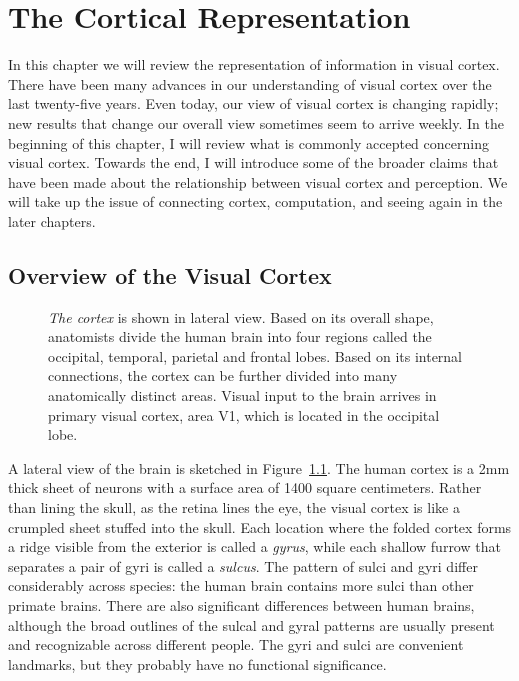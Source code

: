 \chapter{The Cortical Representation}
\label{chapter:Cortex}

In this chapter we will review the representation of information in
visual cortex.  There have been many advances in our understanding of
visual cortex over the last twenty-five years.  Even today, our view
of visual cortex is changing rapidly; new results that change our
overall view sometimes seem to arrive weekly.  In the beginning of
this chapter, I will review what is commonly accepted concerning
visual cortex.  Towards the end, I will introduce some of the broader
claims that have been made about the relationship between visual
cortex and perception.  We will take up the issue of connecting
cortex, computation, and seeing again in the later chapters.

\section{Overview of the Visual Cortex}

\begin{figure}
\centerline{
}
\caption[A view of the brain]{
{\em The cortex} is shown in lateral view.
Based on its overall shape,
anatomists divide the human brain into four regions
called the occipital, temporal, parietal and frontal lobes.
Based on its internal connections,
the cortex can be further divided into many 
anatomically distinct areas.
Visual input to the brain arrives in primary visual cortex,
area V1, which is located in the occipital lobe.
}
\label{f5:brain}
\end{figure}
A lateral view of the brain is sketched in Figure~\ref{f5:brain}. 
The human cortex is a 2mm thick sheet of neurons with a surface
area of 1400 square centimeters.
Rather than lining the skull, as
the retina lines the eye, the visual cortex is like a crumpled
sheet stuffed into the skull.
Each location where the
folded cortex forms a ridge visible from the exterior is called a {\em
gyrus}, while each shallow furrow that separates a pair of gyri is
called a {\em sulcus}.  The pattern of sulci and gyri differ
considerably across species:
the human brain contains more sulci than other primate brains.
There are also significant differences
between human brains, although the broad outlines of the sulcal
and gyral patterns are usually present and
recognizable across different people.
The gyri and sulci are convenient landmarks, but they probably
have no functional significance.

